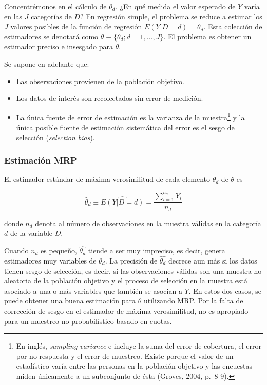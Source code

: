 \documentclass[]{article}
\let\rmarkdownfootnote\footnote%
\def\footnote{\protect\rmarkdownfootnote}
\begin{document}
Concentrémonos en el cálculo de $\theta_d$. ¿En qué medida el valor
esperado de $Y$ varía en las $J$ categorías de $D$? En regresión simple,
el problema se reduce a estimar los $J$ valores posibles de la función
de regresión $E(Y|D=d)=\theta_d$. Esta colección de estimadores se
denotará como $\theta \equiv \{ \theta_d; d=1, ..., J \}$. El problema
es obtener un estimador preciso e insesgado para $\theta$.

Se supone en adelante que:

\begin{itemize}
\itemsep1pt\parskip0pt
\item
  Las observaciones provienen de la población objetivo.
\item
  Los datos de interés son recolectados sin error de medición.
\item
  La única fuente de error de estimación es la varianza de la
  muestra\footnote{En inglés, \emph{sampling variance} e incluye la suma
    del error de cobertura, el error por no respuesta y el error de
    muestreo. Existe porque el valor de un estadístico varía entre las
    personas en la población objetivo y las encuestas miden únicamente a
    un subconjunto de ésta (Groves, 2004, p.~8-9).} y la única posible
  fuente de estimación sistemática del error es el sesgo de selección
  (\emph{selection bias}).
\end{itemize}

\subsubsection{Estimación MRP}\label{estimacion-mrp}

El estimador estándar de máxima verosimilitud de cada elemento
$\theta_d$ de $\theta$ es

\[
\hat{\theta}_d \equiv \hat{E(Y|D=d)} = \frac{\sum_{i=1}^{n_d} Y_i}{n_d}
\]

donde $n_d$ denota al número de observaciones en la muestra válidas en
la categoría $d$ de la variable $D$.

Cuando $n_d$ es pequeño, $\hat{\theta_d}$ tiende a ser muy impreciso, es
decir, genera estimadores muy variables de $\theta_d$. La precisión de
$\hat{\theta_d}$ decrece aun más si los datos tienen sesgo de selección,
es decir, si las observaciones válidas son una muestra no aleatoria de
la población objetivo y el proceso de selección en la muestra está
asociado a una o más variables que también se asocian a $Y$. En estos
dos casos, se puede obtener una buena estimación para $\theta$
utilizando MRP. Por la falta de corrección de sesgo en el estimador de
máxima verosimilitud, no es apropiado para un muestreo no probabilístico
basado en cuotas.
\end{document}
